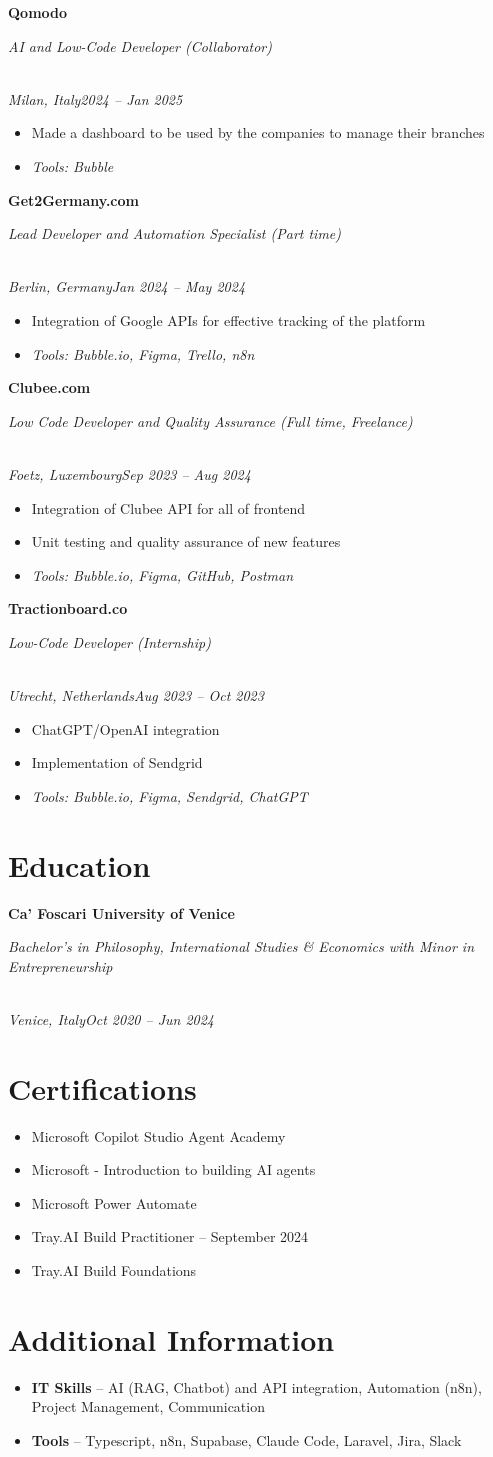 \documentclass[a4paper,10pt]{article}
\newcommand{\role}[4]{\vspace{3pt}\noindent\hspace{0.6em}\parbox[t]{0.38\textwidth}{\raggedright\textbf{#1}}\hfill\parbox[t]{0.58\textwidth}{\raggedleft\textit{#2}}\\{\textit{#3}\hfill\textit{#4}}\vspace{1pt}}
\begin{document}
\role{Qomodo}{AI and Low-Code Developer (Collaborator)}{Milan, Italy}{2024 -- Jan 2025}
\begin{itemize}
\item Made a dashboard to be used by the companies to manage their branches
\item \textit{Tools: Bubble}
\end{itemize}

\role{Get2Germany.com}{Lead Developer and Automation Specialist (Part time)}{Berlin, Germany}{Jan 2024 -- May 2024}
\begin{itemize}
\item Integration of Google APIs for effective tracking of the platform
\item \textit{Tools: Bubble.io, Figma, Trello, n8n}
\end{itemize}

\role{Clubee.com}{Low Code Developer and Quality Assurance (Full time, Freelance)}{Foetz, Luxembourg}{Sep 2023 -- Aug 2024}
\begin{itemize}
\item Integration of Clubee API for all of frontend
\item Unit testing and quality assurance of new features
\item \textit{Tools: Bubble.io, Figma, GitHub, Postman}
\end{itemize}

\role{Tractionboard.co}{Low-Code Developer (Internship)}{Utrecht, Netherlands}{Aug 2023 -- Oct 2023}
\begin{itemize}
\item ChatGPT/OpenAI integration
\item Implementation of Sendgrid
\item \textit{Tools: Bubble.io, Figma, Sendgrid, ChatGPT}
\end{itemize}

\section{Education}
\role{Ca' Foscari University of Venice}{Bachelor's in Philosophy, International Studies \& Economics with Minor in Entrepreneurship}{Venice, Italy}{Oct 2020 -- Jun 2024}

\section{Certifications}
\begin{itemize}
\item Microsoft Copilot Studio Agent Academy
\item Microsoft - Introduction to building AI agents
\item Microsoft Power Automate
\item Tray.AI Build Practitioner -- September 2024
\item Tray.AI Build Foundations
\end{itemize}

\section{Additional Information}
\begin{itemize}
\item \textbf{IT Skills} -- AI (RAG, Chatbot) and API integration, Automation (n8n), Project Management, Communication
\item \textbf{Tools} -- Typescript, n8n, Supabase, Claude Code, Laravel, Jira, Slack
\end{itemize}
\end{document}
